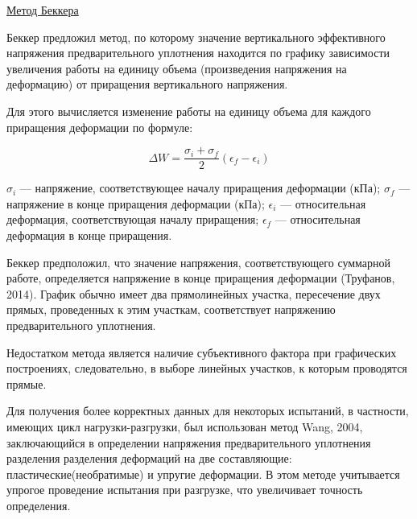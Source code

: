 \underline{Метод Беккера}

Беккер предложил метод, по которому значение вертикального эффективного 
напряжения предварительного уплотнения находится по 
графику зависимости увеличения работы на единицу объема 
(произведения напряжения на деформацию) от приращения вертикального напряжения.

Для этого вычисляется изменение работы на единицу объема для каждого
приращения деформации по формуле:

\[
   \Delta W = \frac{\sigma_i + \sigma_f}{2}(\epsilon_f - \epsilon_i)
\]

$\sigma_i$ --- напряжение, соответствующее началу приращения деформации (кПа); 
$\sigma_f$ --- напряжение в конце приращения деформации (кПа);
$\epsilon_i$ --- относительная деформация, соответствующая началу приращения; 
$\epsilon_f$ --- относительная деформация в конце
приращения.

Беккер предположил, что значение напряжения, соответствующего суммарной 
работе, определяется напряжение в конце приращения деформации (Труфанов, 2014).
График обычно имеет два прямолинейных участка, пересечение 
двух прямых, проведенных к этим участкам, соответствует 
напряжению предварительного уплотнения. 

Недостатком метода является наличие субъективного фактора при
графических построениях, следовательно, в выборе линейных участков, 
к которым проводятся прямые.

Для получения более корректных данных для некоторых испытаний, 
в частности, имеющих цикл нагрузки-разгрузки, был использован 
метод Wang, 2004, заключающийся в определении напряжения 
предварительного уплотнения разделения разделения деформаций на две 
составляющие: пластические(необратимые) и упругие деформации.
В этом методе учитывается упрогое проведение испытания при разгрузке, 
что увеличивает точность определения.


